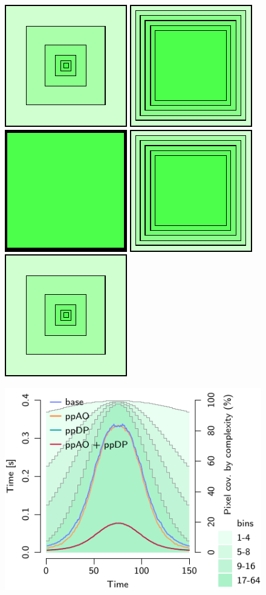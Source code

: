 \documentclass{egpubl}
\begin{document}
\begin{figure}[t]
  \centering
  \begin{minipage}{1.0\linewidth}\centering 
    \includegraphics[width=0.14\linewidth]{figures/quads1}\hfill 
    \includegraphics[width=0.14\linewidth]{figures/quads2}\hfill 
    \includegraphics[width=0.14\linewidth]{figures/quads3}\hfill 
    \includegraphics[width=0.14\linewidth]{figures/quads2}\hfill 
    \includegraphics[width=0.14\linewidth]{figures/quads1}\hfill \hspace{6mm}
  \end{minipage}
  \begin{minipage}{1.0\linewidth}\centering
    \includegraphics[width=\linewidth]{figures/plot-viewdep-quad-tall} 

\end{minipage}
\end{figure}
\end{document}
